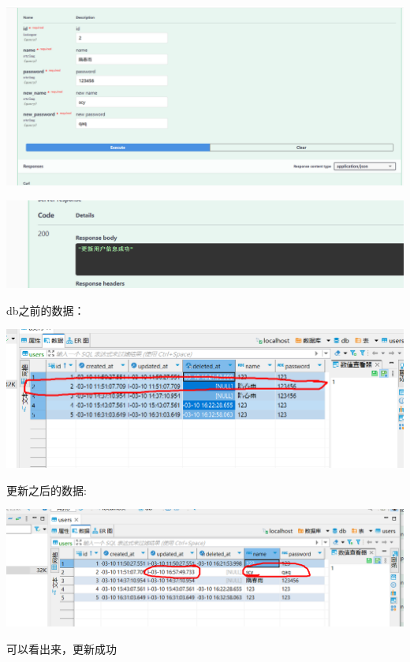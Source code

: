 \documentclass[12pt]{article}
\begin{document}
	\includegraphics{12.png}
	
	\includegraphics{13.png}
	
	db之前的数据：
	
	\includegraphics{14.png}
	
	更新之后的数据:
	
	\includegraphics{15.png}
	
	可以看出来，更新成功
	
\end{document}
